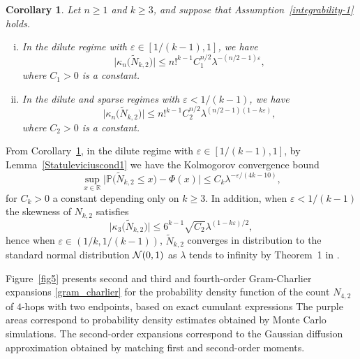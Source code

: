 \documentclass[12pt]{article}
\newcommand{\R}{\mathbb{R}}
\newcommand{\IP}{\mathbb{P}}
\newtheorem{corollary}[prop]{Corollary}
\numberwithin{equation}{section}
\begin{document}
\begin{corollary}
\label{fjkl}
Let $n\geq 1$ and $k\geq 3$,
and suppose that Assumption~\eqref{integrability-1} holds. 
\begin{enumerate}[i)]
\item In the dilute regime with $\varepsilon \in [1/(k-1),1]$, we have 
$$
  \big|
  \kappa_n\big(\widetilde{N}_{k,2}\big)
  \big|
  \leq n!^{k-1}C_1^{n/2}\lambda^{-(n/2-1)\varepsilon },
$$
 where $C_1>0$ is a constant.
\item In the dilute and sparse regimes with $\varepsilon < 1 / ( k-1)$,
  we have 
$$
  \big| \kappa_n\big(\widetilde{N}_{k,2}\big)
  \big|
  \leq n!^{k-1} C_2^{n/2} \lambda^{(n/2-1)(1 - k \varepsilon )}, 
$$ 
where $C_2>0$ is a constant. 
\end{enumerate}
\end{corollary}
 From Corollary~\ref{fjkl}, 
 in the dilute regime with $\varepsilon \in [1/(k-1),1]$,
  by Lemma~\ref{Statuleviciuscond1}
   we have the Kolmogorov convergence bound 
\begin{equation}
\nonumber
\sup_{x\in\R}\big|\IP \big(\widetilde{N}_{k,2}\leq x\big)-\Phi(x)\big|\leq
C_k \lambda^{ - \varepsilon / ( 4k-10) },
\end{equation}
 for $C_k>0$ a constant depending only on $k \geq 3$. 
 In addition, when $\varepsilon < 1/(k-1)$ the skewness of $N_{k,2}$ satisfies  
$$
\big|   \kappa_3\big(\widetilde{N}_{k,2}\big)
\big|
\leq 6^{k-1}\sqrt{C_2} \lambda^{(1- k \varepsilon )/2}, 
$$ 
hence when $\varepsilon \in (1/k, 1/(k-1))$, 
 $\widetilde{N}_{k,2}$
 converges in distribution
 to the standard normal distribution
 ${\cal N}(0,1)$ as $\lambda$ tends to infinity 
 by Theorem~1 in \cite{Janson1988}.  


   \medskip

     \noindent
 Figure~\ref{fig5} presents 
second and third and fourth-order Gram-Charlier expansions \eqref{gram_charlier}
 for the probability density function of the
 count $N_{4,2}$ of $4$-hops with two endpoints,
 based on exact cumulant expressions  
 The purple areas correspond to probability density estimates
obtained by Monte Carlo simulations. 
The second-order expansions correspond to
the Gaussian diffusion approximation 
obtained by matching first and second-order moments. 
  
\end{document}

